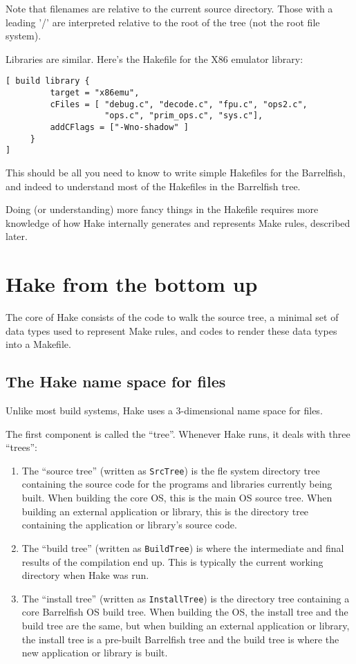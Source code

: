 \documentclass[a4paper,twoside]{report} %
\begin{document}
Note that filenames are relative to the current source
directory. Those with a leading '/' are interpreted relative to the
root of the tree (not the root file system).   

Libraries are similar.  Here's the Hakefile for the X86 emulator
library:
\begin{verbatim}
[ build library { 
         target = "x86emu",
         cFiles = [ "debug.c", "decode.c", "fpu.c", "ops2.c",
                    "ops.c", "prim_ops.c", "sys.c"],
         addCFlags = ["-Wno-shadow" ]
     }
]
\end{verbatim}
This should be all you need to know to write simple Hakefile{s} for
the Barrelfish, and indeed to understand most of the Hakefile{s} in
the Barrelfish tree.

Doing (or understanding) more fancy things in the Hakefile requires
more knowledge of how Hake internally generates and represents Make
rules, described later. 

\chapter{Hake from the bottom up}

The core of Hake consists of the code to walk the source tree, a
minimal set of data types used to represent Make rules, and codes to
render these data types into a Makefile.  

\section{The Hake name space for files}

Unlike most build systems, Hake uses a 3-dimensional name space for
files.  

The first component is called the ``tree''.  Whenever Hake runs, it
deals with three ``trees'':
\begin{enumerate}

\item The ``source tree'' (written as \texttt{SrcTree}) is the fle
  system directory tree containing the source code for the programs
  and libraries currently being built.  When building the core OS,
  this is the main OS source tree. When building an external
  application or library, this is the directory tree containing the
  application or library's source code. 

\item The ``build tree'' (written as \texttt{BuildTree}) is where the
  intermediate and final results of the compilation end up.  This is
  typically the current working directory when Hake was run. 

\item The ``install tree'' (written as \texttt{InstallTree}) is the
  directory tree containing a core Barrelfish OS build tree.  When
  building the OS, the install tree and the build tree are the same,
  but when building an external application or library, the install
  tree is a pre-built Barrelfish tree and the build tree is where the
  new application or library is built. 
\end{enumerate}
\end{document}
